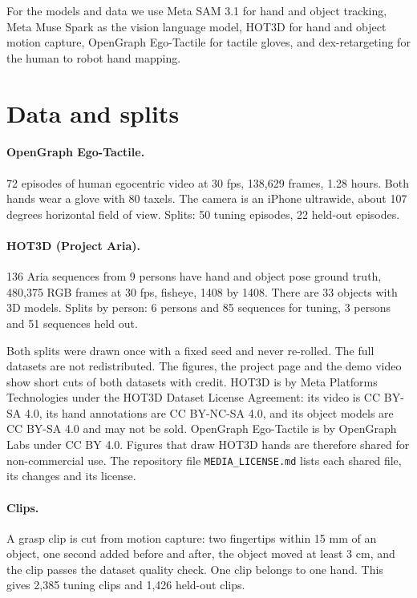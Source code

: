 \documentclass[10pt,twocolumn,letterpaper]{article}
\begin{document}
For the models and data we use Meta SAM 3.1 for hand and object tracking, Meta
Muse Spark as the vision language model, HOT3D \cite{hot3d} for hand and object
motion capture, OpenGraph Ego-Tactile \cite{egotactile} for tactile gloves, and
dex-retargeting \cite{dexretargeting} for the human to robot hand mapping.

\section{Data and splits}

\paragraph{OpenGraph Ego-Tactile.} 72 episodes of human egocentric video at 30 fps,
138,629 frames, 1.28 hours. Both hands wear a glove with 80 taxels. The camera
is an iPhone ultrawide, about 107 degrees horizontal field of view. Splits:
50 tuning episodes, 22 held-out episodes.

\paragraph{HOT3D (Project Aria).} 136 Aria sequences from 9 persons have hand
and object pose ground truth, 480,375 RGB frames at 30 fps, fisheye,
1408 by 1408. There are 33 objects with 3D models. Splits by person: 6 persons
and 85 sequences for tuning, 3 persons and 51 sequences held out.

Both splits were drawn once with a fixed seed and never re-rolled. The full
datasets are not redistributed. The figures, the project page and the demo
video show short cuts of both datasets with credit. HOT3D is by Meta Platforms
Technologies under the HOT3D Dataset License Agreement: its video is
CC BY-SA 4.0, its hand annotations are CC BY-NC-SA 4.0, and its object models
are CC BY-SA 4.0 and may not be sold. OpenGraph Ego-Tactile is by OpenGraph
Labs under CC BY 4.0. Figures that draw HOT3D hands are therefore shared for
non-commercial use. The repository file \texttt{MEDIA\_LICENSE.md} lists each
shared file, its changes and its license.

\paragraph{Clips.} A grasp clip is cut from motion capture: two fingertips
within 15 mm of an object, one second added before and after, the object moved
at least 3 cm, and the clip passes the dataset quality check. One clip belongs
to one hand. This gives 2,385 tuning clips and 1,426 held-out clips.
\end{document}
